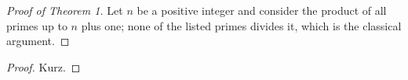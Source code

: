 \documentclass[12pt]{article}
\begin{document}
\begin{proof}[Proof of Theorem 1]
Let $n$ be a positive integer and consider the product of all primes up to $n$ plus one; none of the listed primes divides it, which is the classical argument.
\end{proof}
\renewcommand{\proofname}{Beweis}
\begin{proof}
Kurz.
\end{proof}
\end{document}
